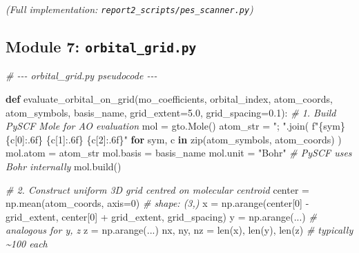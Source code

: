 \documentclass[
  11pt,
]{report}
\newenvironment{Shaded}{}{}
\newcommand{\BuiltInTok}[1]{\textcolor[rgb]{0.00,0.50,0.00}{#1}}
\newcommand{\CommentTok}[1]{\textcolor[rgb]{0.38,0.63,0.69}{\textit{#1}}}
\newcommand{\ControlFlowTok}[1]{\textcolor[rgb]{0.00,0.44,0.13}{\textbf{#1}}}
\newcommand{\DecValTok}[1]{\textcolor[rgb]{0.25,0.63,0.44}{#1}}
\newcommand{\FloatTok}[1]{\textcolor[rgb]{0.25,0.63,0.44}{#1}}
\newcommand{\KeywordTok}[1]{\textcolor[rgb]{0.00,0.44,0.13}{\textbf{#1}}}
\newcommand{\NormalTok}[1]{#1}
\newcommand{\OperatorTok}[1]{\textcolor[rgb]{0.40,0.40,0.40}{#1}}
\newcommand{\SpecialCharTok}[1]{\textcolor[rgb]{0.25,0.44,0.63}{#1}}
\newcommand{\SpecialStringTok}[1]{\textcolor[rgb]{0.73,0.40,0.53}{#1}}
\newcommand{\StringTok}[1]{\textcolor[rgb]{0.25,0.44,0.63}{#1}}
\begin{document}
\emph{(Full implementation: \texttt{report2\_scripts/pes\_scanner.py})}

\subsection{\texorpdfstring{Module 7:
\texttt{orbital\_grid.py}}{Module 7: orbital\_grid.py}}\label{module-7-orbital_grid.py}

\begin{Shaded}
\begin{Highlighting}[]
\CommentTok{\# {-}{-}{-} orbital\_grid.py pseudocode {-}{-}{-}}

\KeywordTok{def}\NormalTok{ evaluate\_orbital\_on\_grid(mo\_coefficients, orbital\_index,}
\NormalTok{                              atom\_coords, atom\_symbols, basis\_name,}
\NormalTok{                              grid\_extent}\OperatorTok{=}\FloatTok{5.0}\NormalTok{, grid\_spacing}\OperatorTok{=}\FloatTok{0.1}\NormalTok{):}
    \CommentTok{\# 1. Build PySCF Mole for AO evaluation}
\NormalTok{    mol }\OperatorTok{=}\NormalTok{ gto.Mole()}
\NormalTok{    atom\_str }\OperatorTok{=} \StringTok{"; "}\NormalTok{.join(}
        \SpecialStringTok{f"}\SpecialCharTok{\{}\NormalTok{sym}\SpecialCharTok{\}}\SpecialStringTok{ }\SpecialCharTok{\{}\NormalTok{c[}\DecValTok{0}\NormalTok{]}\SpecialCharTok{:.6f\}}\SpecialStringTok{ }\SpecialCharTok{\{}\NormalTok{c[}\DecValTok{1}\NormalTok{]}\SpecialCharTok{:.6f\}}\SpecialStringTok{ }\SpecialCharTok{\{}\NormalTok{c[}\DecValTok{2}\NormalTok{]}\SpecialCharTok{:.6f\}}\SpecialStringTok{"}
        \ControlFlowTok{for}\NormalTok{ sym, c }\KeywordTok{in} \BuiltInTok{zip}\NormalTok{(atom\_symbols, atom\_coords)}
\NormalTok{    )}
\NormalTok{    mol.atom }\OperatorTok{=}\NormalTok{ atom\_str}
\NormalTok{    mol.basis }\OperatorTok{=}\NormalTok{ basis\_name}
\NormalTok{    mol.unit }\OperatorTok{=} \StringTok{"Bohr"}           \CommentTok{\# PySCF uses Bohr internally}
\NormalTok{    mol.build()}

    \CommentTok{\# 2. Construct uniform 3D grid centred on molecular centroid}
\NormalTok{    center }\OperatorTok{=}\NormalTok{ np.mean(atom\_coords, axis}\OperatorTok{=}\DecValTok{0}\NormalTok{)    }\CommentTok{\# shape: (3,)}
\NormalTok{    x }\OperatorTok{=}\NormalTok{ np.arange(center[}\DecValTok{0}\NormalTok{] }\OperatorTok{{-}}\NormalTok{ grid\_extent,}
\NormalTok{                   center[}\DecValTok{0}\NormalTok{] }\OperatorTok{+}\NormalTok{ grid\_extent, grid\_spacing)}
\NormalTok{    y }\OperatorTok{=}\NormalTok{ np.arange(...)                        }\CommentTok{\# analogous for y, z}
\NormalTok{    z }\OperatorTok{=}\NormalTok{ np.arange(...)}
\NormalTok{    nx, ny, nz }\OperatorTok{=} \BuiltInTok{len}\NormalTok{(x), }\BuiltInTok{len}\NormalTok{(y), }\BuiltInTok{len}\NormalTok{(z)      }\CommentTok{\# typically \textasciitilde{}100 each}


\end{Highlighting}
\end{Shaded}
\end{document}
